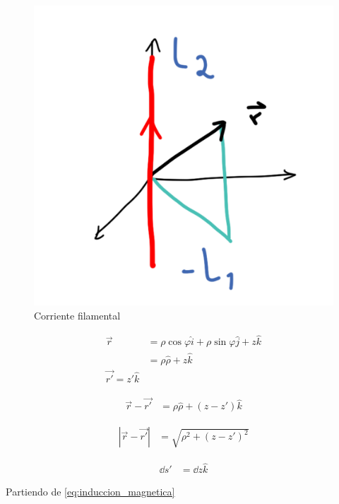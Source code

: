 \documentclass[11pt]{report}
\theoremstyle{plain}
\theoremstyle{definition}
\begin{document}
	\begin{figure}[!h]
		\centering
		\includegraphics[scale=0.15]{Ejercicio3.png}
		\caption{Corriente filamental}
		\label{fig:Ejercicio3}
	\end{figure}

\begin{align*} %
	\vec{r} &= \rho\cos{\varphi}\hat{i} + \rho\sin{\varphi}\hat{j} + z\hat{k}\\
	&= \rho\hat{\rho} + z\hat{k}\\
	\vec{r'} = z'\hat{k}
\end{align*}

\begin{align*} %
	\vec{r} -\vec{r'} &= \rho\hat{\rho} + \left(z- z'\right)\hat{k}
\end{align*}

\begin{align*} %
	|\vec{r} -\vec{r'}| &= \sqrt{\rho^2 + \left(z- z'\right)^2}
\end{align*}

\begin{align*} %
	\dd{s'} &= \dd{z}\hat{k}
\end{align*}


Partiendo de \ref{eq:induccion_magnetica}
\end{document}
